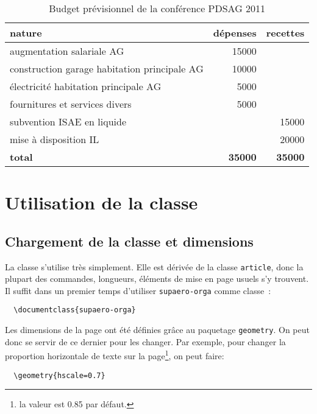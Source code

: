 \documentclass[french]{supaero-orga}
\begin{document}
\begin{table}[h]
  \centering
  \begin{tabular}[h]{l r r}
    \toprule[1.5pt]
    \textbf{nature} & \textbf{dépenses} & \textbf{recettes}\\
    \midrule
    augmentation salariale AG & 15000 & \\
    construction garage habitation principale AG & 10000\\
    électricité habitation principale AG & 5000\\
    fournitures et services divers & 5000\\
    \midrule
    subvention ISAE en liquide & & 15000\\
    mise à disposition IL & & 20000\\
    \midrule
    \textbf{total} & \textbf{35000} & \textbf{35000}\\
    \bottomrule[1.5pt]
  \end{tabular}
  \caption{Budget prévisionnel de la conférence PDSAG 2011}
  \label{tab:budget}
\end{table}

\section{Utilisation de la classe}
\label{sec:utilisation-de-la}

\subsection{Chargement de la classe et dimensions}
\label{sec:chargement-classe}

La classe s'utilise très simplement. Elle est dérivée de la classe
\texttt{article}, donc la plupart des commandes, longueurs, éléments
de mise en page usuels s'y trouvent. Il suffit dans un premier temps
d'utiliser \texttt{supaero-orga} comme classe~:

\begin{verbatim}
  \documentclass{supaero-orga}
\end{verbatim}

Les dimensions de la page ont été définies grâce au paquetage
\texttt{geometry}. On peut donc se servir de ce dernier pour les
changer. Par exemple, pour changer la proportion horizontale de texte
sur la page\footnote{la valeur est 0.85 par défaut.}, on peut faire:

\begin{verbatim}
  \geometry{hscale=0.7}
\end{verbatim}
\end{document}
